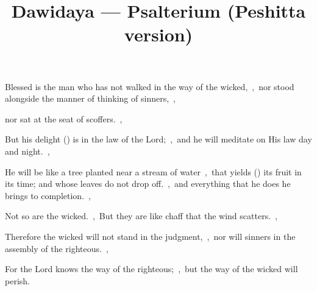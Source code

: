 \documentclass[12pt,twoside,a5paper]{article}
\begin{document}

\title{Dawidaya --- Psalterium (Peshitta version)}
\author{}
\date{}
\maketitle






\begin{normalparskip}
  Blessed is the man who has not walked in the way of the wicked,~\sep\ nor stood alongside the manner of thinking of sinners,~\sep


  nor sat at the seat of scoffers.~\sep

  But his delight () is in the law of the Lord;~\sep\ and he will meditate on His law day and night.~\sep

  He will be like a tree planted near a stream of water~\sep\ that yields () its fruit in its time; and whose leaves do not drop off.~\sep\ and everything that he does he brings to completion.~\sep

  Not so are the wicked.~\sep\ But they are like chaff that the wind scatters.~\sep

  Therefore the wicked will not stand in the judgment,~\sep\ nor will sinners in the assembly of the righteous.~\sep

  For the Lord knows the way of the righteous;~\sep\ but the way of the wicked will perish.
\end{normalparskip}

\end{document}
